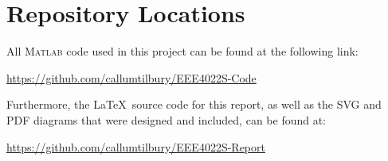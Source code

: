 \documentclass[class=report,11pt,crop=false]{standalone}
\begin{document}
\chapter{Repository Locations}
All \textsc{Matlab} code used in this project can be found at the following link:

\begin{center}
    \url{https://github.com/callumtilbury/EEE4022S-Code}
\end{center}

\vspace{1cm}

Furthermore, the \LaTeX~source code for this report, as well as the SVG and PDF diagrams that were designed and included, can be found at:

\begin{center}
    \url{https://github.com/callumtilbury/EEE4022S-Report}
\end{center}
\ifstandalone
% 
\fi
\end{document}
